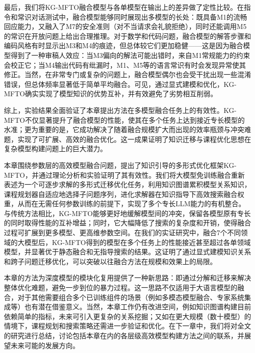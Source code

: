 \documentclass[../main.tex]{subfiles}
\begin{document}
最后，我们将KG-MFTO融合模型与各单模型在输出上的差异做了定性比较。在指令和常识对话测试中，融合模型能够同时展现出多模型的长处：既具备M1的流畅回应能力，又融入了M7的安全准则（对不当请求会礼貌拒绝），同时还能调用M5的常识在开放问题上给出合理推理。对于数学和代码问题，融合模型的解答步骤和编码风格有时显示出M3和M4的痕迹，但总体较它们更加稳健——这是因为融合模型得到了一种审稿人效应：当M3偏向的解法可能出错时，来自M1常规能力的约束会校正它；当M4输出代码有纰漏时，M1、M5等的语言常识有时会发现异常使其修正。当然，在非常专门或复杂的问题上，融合模型偶尔也会受干扰出现一些混淆错误，但总体频率显著低于简单平均融合。可见，通过显式建模和优化，KG-MFTO确实实现了模型知识的优势互补，并有效避免了劣势相互削弱。

综上，实验结果全面验证了本章提出方法在多模型融合任务上的有效性。KG-MFTO不仅显著提升了融合模型的性能，使其在多个任务上达到接近专长模型的水准；更为重要的是，它成功解决了随着融合规模扩大而出现的效率瓶颈与冲突难题，实现了可扩展、高效的融合优化。这一成果证明了知识迁移与课程优化思想在复杂模型构建问题上的巨大潜力。

\label{sec:ch5-7-chapter-summary}

本章围绕参数层的高效模型融合问题，提出了知识引导的多形式优化框架KG-MFTO，并通过理论分析和实验证明了其有效性。我们将大模型免训练融合重新表述为一个可逐步求解的多形式迁移优化任务，利用知识图谱累积模型关系知识，课程规划器自适应地选择子问题序列，进化求解器在知识指导下高效搜索融合权重，从而在无需任何参数训练的前提下，实现了多个专长LLM能力的有机整合。与传统方法相比，KG-MFTO能够更好地缓解模型间的冲突，保留各模型原有专长的同时取得性能的互补增益；同时，它大幅降低了搜索的复杂度和开销，使得融合过程可扩展到更多模型、更高维参数空间。在我们的实证研究中，融合7个不同领域的大模型后，KG-MFTO得到的模型在多个任务上的性能接近甚至超过各单领域模型，并显著优于静态融合和无指导搜索的结果。这证明了通过显式建模知识关系和跨子问题迁移优化，可以突破以往融合方法在规模和效果上的局限。

本章的方法为深度模型的模块化复用提供了一种新思路：即通过分解和迁移来解决整体优化难题，避免一步到位的暴力过程。这一思路不仅适用于大语言模型的融合，对于其他需要组合多个已训练组件的场景（例如多模态模型融合、专家系统集成等）也有潜在借鉴意义。当然，本章工作仍有改进空间，例如知识图谱构建目前依赖简单的指标，未来可引入更复杂的关系挖掘；又如在更大规模（数十模型）的情境下，课程规划和搜索策略还需进一步验证和优化。在下一章中，我们将对全文的研究进行总结，讨论包括本章在内的各层级高效模型构建方法之间的联系，并展望未来可能的发展方向。
\end{document}
